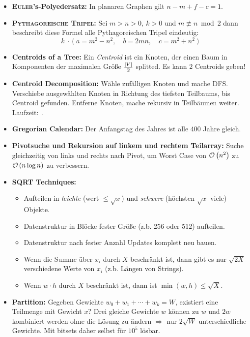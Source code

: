 \begin{itemize}
	\item \textbf{\textsc{Euler}'s-Polyedersatz:}
	In planaren Graphen gilt $n-m+f-c=1$.
	
	\item \textbf{\textsc{Pythagoreische Tripel}:}
	Sei $m>n>0,~k>0$ und $m\not\equiv n \bmod 2$ dann beschreibt diese Formel alle Pythagoreischen Tripel eindeutig:
	\[k~\cdot~\Big(~a=m^2-n^2,\quad b=2mn,\quad c=m^2+n^2~\Big)\]
	
	\item \textbf{Centroids of a Tree:}
	Ein \emph{Centroid} ist ein Knoten, der einen Baum in Komponenten der maximalen Größe $\frac{\left|V\right|}{2}$ splitted.
	Es kann $2$ Centroids geben!
	
	\item \textbf{Centroid Decomposition:}
	Wähle zufälligen Knoten und mache DFS.
	Verschiebe ausgewählten Knoten in Richtung des tiefsten Teilbaums, bis Centroid gefunden. Entferne Knoten, mache rekursiv in Teilbäumen weiter. Laufzeit:~.
	\item \textbf{Gregorian Calendar:} Der Anfangstag des Jahres ist alle $400$ Jahre gleich.

	\item \textbf{Pivotsuche und Rekursion auf linkem und rechtem Teilarray:}
	Suche gleichzeitig von links und rechts nach Pivot, um Worst Case von
	$\mathcal{O}\left(n^2\right)$ zu $\mathcal{O}\left(n\log n\right)$ zu verbessern.
	
	\item \textbf{SQRT Techniques:}
	\begin{itemize}
		\item Aufteilen in \emph{leichte} (wert $\leq\sqrt{x}$) und \emph{schwere} (höchsten $\sqrt{x}$ viele) Objekte.
		\item Datenstruktur in Blöcke fester Größe (z.b. 256 oder 512) aufteilen.
		\item Datenstruktur nach fester Anzahl Updates komplett neu bauen.
		\item Wenn die Summe über $x_i$ durch $X$ beschränkt ist, dann gibt es nur $\sqrt{2X}$ verschiedene Werte von $x_i$ (z.b. Längen von Strings).
		\item Wenn $w\cdot h$ durch $X$ beschränkt ist, dann ist $\min(w,h)\leq\sqrt{X}$.
	\end{itemize}

	\item \textbf{Partition:}
	Gegeben Gewichte $w_0+w_1+\cdots+w_k=W$, existiert eine Teilmenge mit Gewicht $x$?
	Drei gleiche Gewichte $w$ können zu $w$ und $2w$ kombiniert werden ohne die Lösung zu ändern $\Rightarrow$ nur $2\sqrt{W}$ unterschiedliche Gewichte.
	Mit bitsets daher selbst für $10^5$ lösbar.
\end{itemize}

